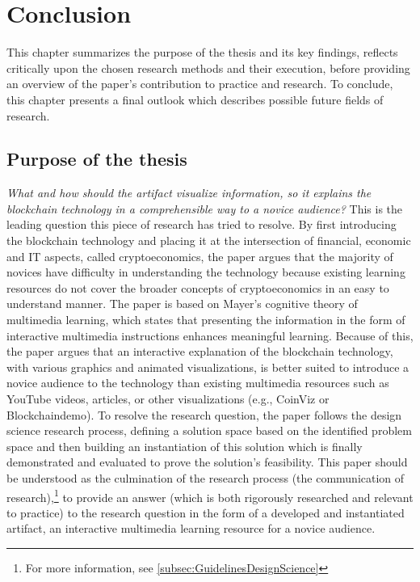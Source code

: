 \chapter{Conclusion} \label{chap:conclusion}

This chapter summarizes the purpose of the thesis and its key findings, reflects critically upon the chosen research methods and their execution, before providing an overview of the paper's contribution to practice and research. To conclude, this chapter presents a final outlook which describes possible future fields of research. 

\section{Purpose of the thesis} \label{sec:findings}
\textit{What and how should the artifact visualize information, so it explains the blockchain technology in a comprehensible way to a novice audience?} This is the leading question this piece of research has tried to resolve. By first introducing the blockchain technology and placing it at the intersection of financial, economic and \ac{IT} aspects, called cryptoeconomics, the paper argues that the majority of novices have difficulty in understanding the technology because existing learning resources do not cover the broader concepts of cryptoeconomics in an easy to understand manner. The paper is based on Mayer's cognitive theory of multimedia learning, which states that presenting the information in the form of interactive multimedia instructions enhances meaningful learning. Because of this, the paper argues that an interactive explanation of the blockchain technology, with various graphics and animated visualizations, is better suited to introduce a novice audience to the technology than existing multimedia resources such as YouTube videos, articles, or other visualizations (e.g., CoinViz or Blockchaindemo). To resolve the research question, the paper follows the design science research process, defining a solution space based on the identified problem space and then building an instantiation of this solution which is finally demonstrated and evaluated to prove the solution's feasibility. This paper should be understood as the culmination of the research process (the communication of research),\footnote{For more information, see \ref{subsec:GuidelinesDesignScience}} to provide an answer (which is both rigorously researched and relevant to practice) to the research question in the form of a developed and instantiated artifact, an interactive multimedia learning resource for a novice audience. 

